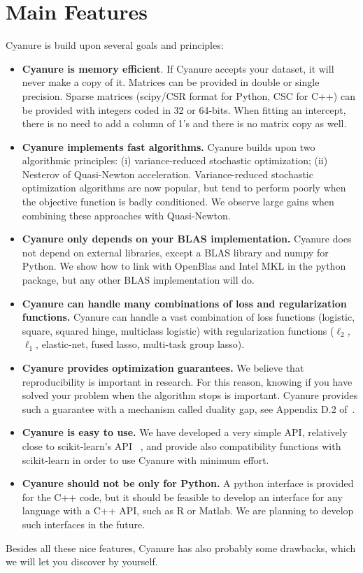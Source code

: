 \documentclass{article}
\begin{document}
\section{Main Features}
Cyanure is build upon several goals and principles:
\begin{itemize}
   \item {\textbf{Cyanure is memory efficient}}. If Cyanure accepts your dataset, it will never make a copy of it. Matrices can be provided in double or single precision. Sparse matrices (scipy/CSR format for Python, CSC for C++)
      can be provided with integers coded in 32 or 64-bits. When fitting an intercept, there is no need to add a column of 1's and there is no matrix copy as well. 
   \item {\textbf{Cyanure implements fast algorithms.}} Cyanure builds upon two algorithmic principles: (i) variance-reduced stochastic optimization; (ii) Nesterov of Quasi-Newton acceleration. Variance-reduced stochastic optimization algorithms are now popular, but tend to perform poorly when the objective function is badly conditioned. We observe large gains when combining these approaches with Quasi-Newton. 
   \item {\textbf{Cyanure only depends on your BLAS implementation.}} Cyanure does not depend on external libraries, except a BLAS library and numpy for Python. We show how to link with OpenBlas and Intel MKL in the python package, but any other BLAS implementation will do.
   \item {\textbf{Cyanure can handle many combinations of loss and regularization functions.}} Cyanure can handle a vast combination of loss functions (logistic, square, squared hinge, multiclass logistic) with regularization functions ($\ell_2$, $\ell_1$, elastic-net, fused lasso, multi-task group lasso).
   \item {\textbf{Cyanure provides optimization guarantees.}} We believe that reproducibility is important in research. For this reason, knowing if you have solved your problem when the algorithm stops is important. Cyanure provides such a guarantee with a mechanism called duality gap, see Appendix D.2 of~\citet{mairal2010sparse}.
   \item {\textbf{Cyanure is easy to use.}} We have developed a very simple API, relatively close to scikit-learn's API ~\citep{scikit}, and provide also compatibility functions with scikit-learn in order to use Cyanure with minimum effort.
   \item {\textbf{Cyanure should not be only for Python.}} A python interface is provided for the C++ code, but it should be feasible to develop an interface for any language with a C++ API, such as R or Matlab. We are planning to develop such interfaces in the future.
\end{itemize}
Besides all these nice features, Cyanure has also probably some drawbacks, which we will let you discover by yourself.  
\end{document}
